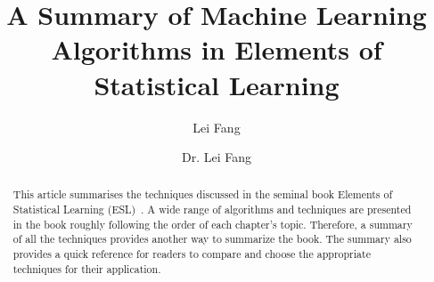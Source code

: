\documentclass[runningheads,a4paper]{llncs}
\author{Lei Fang}
\begin{document}
\mainmatter 

\title{A Summary of Machine Learning Algorithms in Elements of Statistical Learning}

\author{Dr. Lei Fang}



\tocauthor{{}}



\maketitle
\begin{abstract}
This article summarises the techniques discussed in the seminal book Elements of Statistical Learning (ESL)~\cite{Hastie_2009}. A wide range of algorithms and techniques are presented in the book roughly following the order of each chapter's topic. Therefore, a summary of all the techniques provides another way to summarize the book. The summary also provides a quick reference for readers to compare and choose the appropriate techniques for their application. 
\end{abstract}


\medskip

\begingroup
\let\clearpage\relax
\tableofcontents
\endgroup

\medskip
\medskip
	
\end{document}
